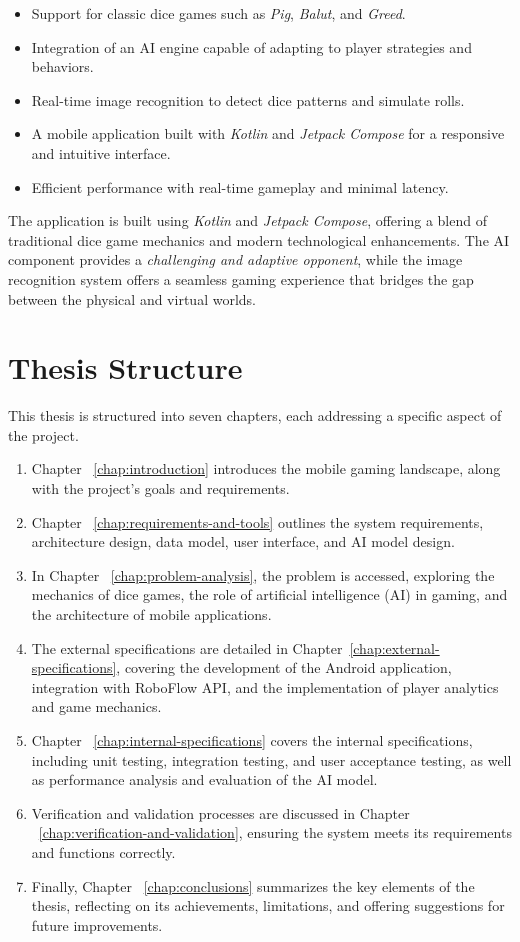 \begin{itemize}
    \item Support for classic dice games such as \emph{Pig}, \emph{Balut}, and \emph{Greed}.
    \item Integration of an AI engine capable of adapting to player strategies and behaviors.
    \item Real-time image recognition to detect dice patterns and simulate rolls.
    \item A mobile application built with \emph{Kotlin} and \emph{Jetpack Compose} for a responsive and intuitive interface.
    \item Efficient performance with real-time gameplay and minimal latency.
\end{itemize}

The application is built using \emph{Kotlin} and \emph{Jetpack Compose}, offering a blend of traditional dice game mechanics and modern technological enhancements. The AI component provides a \emph{challenging and adaptive opponent}, while the image recognition system offers a seamless gaming experience that bridges the gap between the physical and virtual worlds.

\section{Thesis Structure}
This thesis is structured into seven chapters, each addressing a specific aspect of the project.

\begin{enumerate}
    \item Chapter ~\ref{chap:introduction} introduces the mobile gaming landscape, along with the project's goals and requirements.
    \item Chapter ~\ref{chap:requirements-and-tools} outlines the system requirements, architecture design, data model, user interface, and AI model design.
    \item In Chapter ~\ref{chap:problem-analysis}, the problem is accessed, exploring the mechanics of dice games, the role of artificial intelligence (AI) in gaming, and the architecture of mobile applications.
    \item The external specifications are detailed in Chapter~\ref{chap:external-specifications}, covering the development of the Android application, integration with RoboFlow API, and the implementation of player analytics and game mechanics.
    \item Chapter ~\ref{chap:internal-specifications} covers the internal specifications, including unit testing, integration testing, and user acceptance testing, as well as performance analysis and evaluation of the AI model.
    \item Verification and validation processes are discussed in Chapter ~\ref{chap:verification-and-validation}, ensuring the system meets its requirements and functions correctly.
    \item Finally, Chapter ~\ref{chap:conclusions} summarizes the key elements of the thesis, reflecting on its achievements, limitations, and offering suggestions for future improvements.
\end{enumerate}
